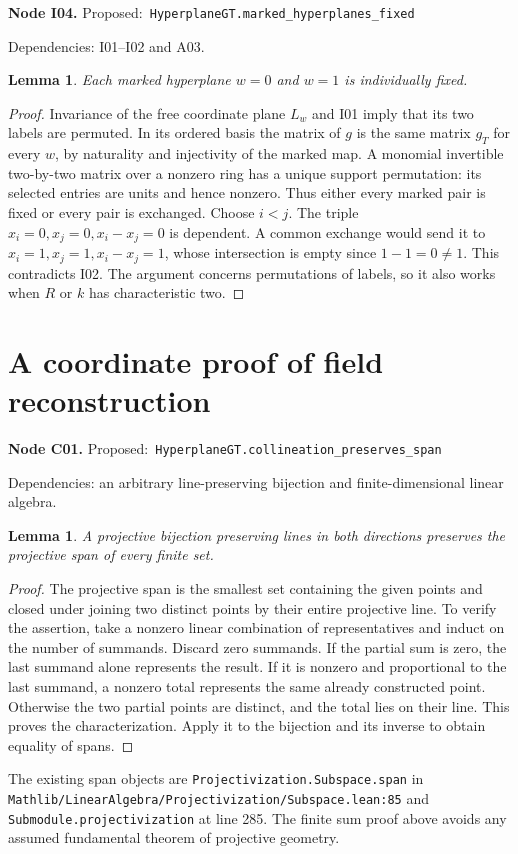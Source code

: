 \documentclass[11pt]{article}
\newtheorem{lemma}[theorem]{Lemma}
\theoremstyle{remark}\newtheorem{remark}[theorem]{Remark}
\newcommand{\code}[1]{\nolinkurl{#1}}
\newcommand{\node}[3]{\par\Needspace{8\baselineskip}\smallskip\noindent\textbf{Node #1.}\quad
 \textsf{Proposed:}\ \code{#2}\par\noindent
 \textsf{Dependencies:} #3.\par\smallskip}
\begin{document}
\node{I04}{HyperplaneGT.marked_hyperplanes_fixed}{I01--I02 and A03}
\begin{lemma}\label{lem:i04}
Each marked hyperplane $w=0$ and $w=1$ is individually fixed.
\end{lemma}
\begin{proof}
Invariance of the free coordinate plane $L_w$ and I01 imply that
its two labels are permuted. In its ordered basis the matrix of
$g$ is the same matrix $g_T$ for every $w$, by naturality and
injectivity of the marked map. A monomial invertible two-by-two
matrix over a nonzero ring has a unique support permutation:
its selected entries are units and hence nonzero. Thus either
every marked pair is fixed or every pair is exchanged. Choose
$i<j$. The triple $x_i=0,x_j=0,x_i-x_j=0$ is dependent. A common
exchange would send it to $x_i=1,x_j=1,x_i-x_j=1$, whose
intersection is empty since $1-1=0\ne1$. This contradicts I02.
The argument concerns permutations of labels, so it also works
when $R$ or $k$ has characteristic two.
\end{proof}

\section{A coordinate proof of field reconstruction}

\node{C01}{HyperplaneGT.collineation_preserves_span}{an arbitrary line-preserving bijection and finite-dimensional linear algebra}
\begin{lemma}\label{lem:c01}
A projective bijection preserving lines in both directions
preserves the projective span of every finite set.
\end{lemma}
\begin{proof}
The projective span is the smallest set containing the given
points and closed under joining two distinct points by their
entire projective line. To verify the assertion, take a nonzero
linear combination of representatives and induct on the number
of summands. Discard zero summands. If the partial sum is zero,
the last summand alone represents the result. If it is nonzero
and proportional to the last summand, a nonzero total represents
the same already constructed point. Otherwise the two partial
points are distinct, and the total lies on their line. This
proves the characterization. Apply it to the bijection and its
inverse to obtain equality of spans.
\end{proof}
The existing span objects are
\code{Projectivization.Subspace.span} in
\code{Mathlib/LinearAlgebra/Projectivization/Subspace.lean:85}
and \code{Submodule.projectivization} at line 285. The finite
sum proof above avoids any assumed fundamental theorem of
projective geometry.
\end{document}
